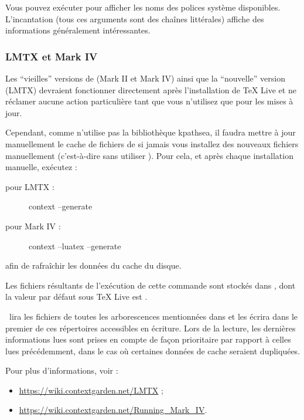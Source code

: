\documentclass[german, english, french]{article}
\renewcommand{\TL}{\TeX{} Live\xspace}%
\begin{document}
Vous pouvez exécuter  pour afficher les noms des polices système
disponibles. L'incantation  (tous ces
arguments sont des chaînes littérales) affiche des informations généralement
intéressantes.

\subsubsection{\protect\ConTeXt{} LMTX et Mark IV}
\label{sec:context-mkiv}

Les \enquote{vieilles} versions de \ConTeXt{} (Mark II et Mark IV) ainsi que la
\enquote{nouvelle} version (LMTX) devraient fonctionner directement après
l'installation de \TL et ne réclamer aucune action particulière tant que vous
n'utilisez que  pour les mises à jour.

Cependant, comme \ConTeXt{} n'utilise pas la bibliothèque kpathsea, il
faudra mettre à jour manuellement le cache de fichiers de \ConTeXt{} si jamais
vous installez des nouveaux fichiers manuellement (c'est-à-dire sans utiliser
). Pour cela, et après chaque installation manuelle, exécutez :
\begin{description}
\item[pour LMTX :]\leavevmode{}
\begin{sverbatim}
context --generate
\end{sverbatim}
\item[pour Mark IV :]\leavevmode{}
\begin{sverbatim}
context --luatex --generate
\end{sverbatim}
\end{description}
afin de rafraîchir les données \ConTeXt{} du cache du disque.

Les fichiers résultants de l'exécution de cette commande sont stockés dans
, dont la valeur par défaut sous \TL{} est
.

\ConTeXt\ lira les fichiers de toutes les arborescences mentionnées dans
 et les écrira dans le premier de ces répertoires
accessibles en écriture. Lors de la lecture, les dernières informations lues
sont prises en compte de façon prioritaire par rapport à celles lues
précédemment, dans le cas où certaines données de cache seraient dupliquées.

Pour plus d'informations, voir :
\begin{itemize}
\item \url{https://wiki.contextgarden.net/LMTX} ;
\item \url{https://wiki.contextgarden.net/Running_Mark_IV}.
\end{itemize}
\end{document}

